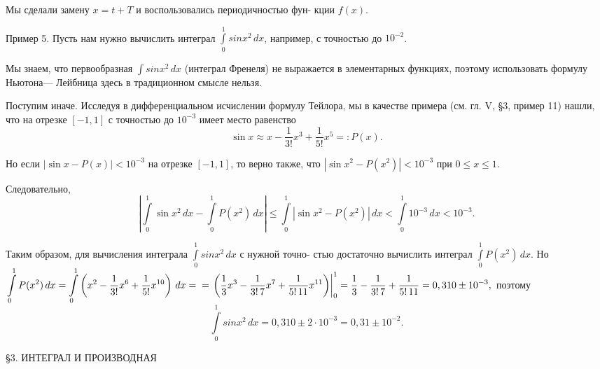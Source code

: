 \documentclass[a4paper, 10pt]{book}
\begin{document}
    \par
    Мы сделали замену $x = t + T$ и воспользовались периодичностью фун-
    кции $f(x)$.
    \par
    Пример 5. Пусть нам нужно вычислить интеграл $\int\limits_{0}^{1} sin{x^2} \,dx$, например, с точностью до $10^{-2}$.
    \par
    Мы знаем, что первообразная $\int sin{x^2} \,dx$ (интеграл Френеля) не выражается в элементарных функциях, поэтому использовать формулу Ньютона—
    Лейбница здесь в традиционном смысле нельзя.
    \par
    Поступим иначе. Исследуя в дифференциальном исчислении формулу Тейлора, 
    мы в качестве примера (см. гл. V, \S 3, пример 11) нашли, 
    что на отрезке $[-1, 1]$ с точностью до $10^{-3}$ имеет место равенство
    \[
    \sin{x} \approx x - \frac{1}{3!}x^{3} + \frac{1}{5!}x^{5}=:P(x).
    \]
    \par
    Но если $|\sin{x} - P(x)| < 10^{-3}$ на отрезке $[-1, 1]$, то верно также, что $|\sin{x^2} - P(x^2)| < 10^{-3}$ при $0 \leq x \leq 1$.
    \par
    Следовательно,
    \[
    \left|
    \int\limits_{0}^{1} \sin{x^2} \,dx - \int\limits_{0}^{1} P(x^2) \,dx
    \right| \leq \int\limits_{0}^{1} \left| \sin{x^2} - P(x^2) \right| \,dx <
    \int\limits_{0}^{1} 10^{-3} \,dx < 10^{-3}.
    \]
    \par
    Таким образом, для вычисления интеграла $\int\limits_{0}^{1} sin{x^2} \,dx$ с нужной точно-
    стью достаточно вычислить интеграл $\int\limits_{0}^{1} P(x^2) \,dx$. Но
    \newline
    $
    \displaystyle
    \int\limits_{0}^{1} P(x^{2}) \,dx = \int\limits_{0}^{1} \left(
    x^{2} - \frac{1}{3!}x^{6} + \frac{1}{5!}x^{10} \right) \,dx =
    \\
    \null\hfill
    =\left.\left(
    \frac{1}{3}x^{3} - \frac{1}{3! \, 7}x^{7} + \frac{1}{5! \, 11}x^{11} \right)\right|_{0}^{1} =
    \frac{1}{3} - \frac{1}{3! \, 7} + \frac{1}{5! \, 11} =
    0,310 \pm 10^{-3},
    $
    \newline
    поэтому
    \[
    \int\limits_{0}^{1} sin{x^2} \,dx = 0,310 \pm 2\cdot10^{-3} = 0,31\pm10^{-2}.
    \]

    \newpage
    \begin{center}
        \S3. ИНТЕГРАЛ И ПРОИЗВОДНАЯ
    \end{center}
\end{document}
